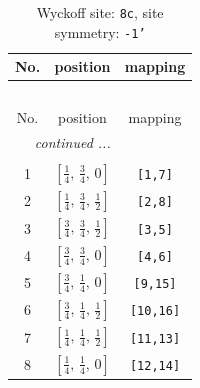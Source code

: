 \documentclass[fleqn,8pt]{jsarticle}
\begin{document}
\renewcommand{\arraystretch}{1.2}
\begin{longtable}{ccc}
\caption{Wyckoff site: {\tt 8c}, site symmetry: {\tt -1'}}
 \\
 \hline \hline
No. & position & mapping \\ \hline \endfirsthead

\multicolumn{2}{l}{\tablename\ \thetable{}} \\
 \hline \hline
No. & position & mapping \\ \hline \endhead

 \hline \hline
\multicolumn{2}{r}{\footnotesize\it continued ...} \\ \endfoot

 \hline \hline
\multicolumn{2}{r}{} \\ \endlastfoot

1 & $\left[ \frac{1}{4},\, \frac{3}{4},\, 0 \right]$ & {\tt [1,7]} \\ \hline
2 & $\left[ \frac{1}{4},\, \frac{3}{4},\, \frac{1}{2} \right]$ & {\tt [2,8]} \\ \hline
3 & $\left[ \frac{3}{4},\, \frac{3}{4},\, \frac{1}{2} \right]$ & {\tt [3,5]} \\ \hline
4 & $\left[ \frac{3}{4},\, \frac{3}{4},\, 0 \right]$ & {\tt [4,6]} \\ \hline
5 & $\left[ \frac{3}{4},\, \frac{1}{4},\, 0 \right]$ & {\tt [9,15]} \\ \hline
6 & $\left[ \frac{3}{4},\, \frac{1}{4},\, \frac{1}{2} \right]$ & {\tt [10,16]} \\ \hline
7 & $\left[ \frac{1}{4},\, \frac{1}{4},\, \frac{1}{2} \right]$ & {\tt [11,13]} \\ \hline
8 & $\left[ \frac{1}{4},\, \frac{1}{4},\, 0 \right]$ & {\tt [12,14]} \\
\end{longtable}
\renewcommand{\arraystretch}{1.2}
\end{document}
